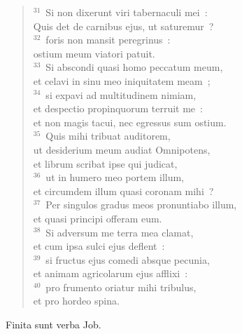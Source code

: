 \begin{flushleft}
\begin{verse}
${}^{31}$~Si non dixerunt viri tabernaculi mei~:\\ Quis det de carnibus ejus, ut saturemur~?\\
${}^{32}$~foris non mansit peregrinus~:\\ ostium meum viatori patuit.\\
${}^{33}$~Si abscondi quasi homo peccatum meum,\\ et celavi in sinu meo iniquitatem meam~;\\
${}^{34}$~si expavi ad multitudinem nimiam,\\ et despectio propinquorum terruit me~:\\ et non magis tacui, nec egressus sum ostium.\\
${}^{35}$~Quis mihi tribuat auditorem,\\ ut desiderium meum audiat Omnipotens,\\ et librum scribat ipse qui judicat,\\
${}^{36}$~ut in humero meo portem illum,\\ et circumdem illum quasi coronam mihi~?\\
${}^{37}$~Per singulos gradus meos pronuntiabo illum,\\ et quasi principi offeram eum.\\
${}^{38}$~Si adversum me terra mea clamat,\\ et cum ipsa sulci ejus deflent~:\\
${}^{39}$~si fructus ejus comedi absque pecunia,\\ et animam agricolarum ejus afflixi~:\\
${}^{40}$~pro frumento oriatur mihi tribulus,\\ et pro hordeo spina.\end{verse}\end{flushleft}

 Finita sunt verba Job.

